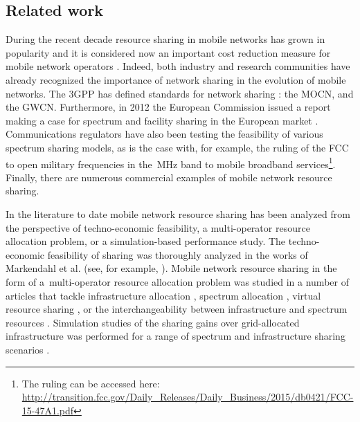 \documentclass[12pt, journal,doublecolumn, final]{IEEEtran}
\begin{document}
\subsection{Related work}

During the recent decade resource sharing in mobile networks has grown in popularity and it is considered now an important cost reduction measure for mobile network operators \cite{MeddourRasheedGourhant_2011}. Indeed, both industry and research communities have already recognized the importance of network sharing in the evolution of mobile networks. The \ac{3GPP} has defined standards for network sharing \cite{3gpp23.251_2014}: the \ac{MOCN}, and the \ac{GWCN}. Furthermore, in 2012 the European Commission issued a report making a case for spectrum and facility sharing in the European market \cite{EC_2012}. Communications regulators have also been testing the feasibility of various spectrum sharing models, as is the case with, for example, the ruling of the \ac{FCC} to open military frequencies in the~\unit[3550-3700]{MHz} band to mobile broadband services\footnote{The ruling can be accessed here: \url{http://transition.fcc.gov/Daily_Releases/Daily_Business/2015/db0421/FCC-15-47A1.pdf}}. Finally, there are numerous commercial examples of mobile network resource sharing.

In the literature to date mobile network resource sharing has been analyzed from the perspective of techno-economic feasibility, a multi-operator resource allocation problem, or a simulation-based performance study. The techno-economic feasibility of sharing was thoroughly analyzed in the works of Markendahl et al. (see, for example, \cite{Markendahl_2011,AhmedYangSungMarkendahl_2015}). Mobile network resource sharing in the form of a~multi-operator resource allocation problem was studied in a number of articles that tackle infrastructure allocation \cite{KibildaDaSilva_2013,CanoCaponeCarelloCesena_2015,AntonopoulosKartsakliBousiaEtAl_2015}, spectrum allocation \cite{HewWhite_2008,JorswieckBadiaFahldieckKaripidisEtAl_2014}, virtual resource sharing \cite{TseliouAdelantadoVerikoukis_2016}, or the interchangeability between infrastructure and spectrum resources \cite{MarottaKaminskiGomes-MiguelezGranvilleEtAl_2015,MacalusoAhmadiGomez-MiguelezEtAl_2016}. Simulation studies of the sharing gains over grid-allocated infrastructure was performed for a range of spectrum and infrastructure sharing scenarios \cite{MiddletonHooliTolliLilleberg_2006,JorswieckBadiaFahldieckKaripidisEtAl_2014,PanchalYatesBuddhikot_2013,LuotoPirinenBennisEtAl_2015}.
\end{document}
